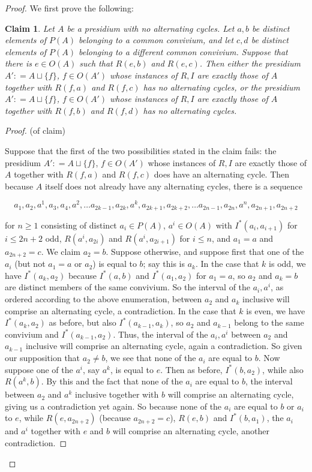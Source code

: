 \documentclass[10pt,a4paper]{amsart}
\newtheorem{claim}{Claim}
\begin{document}
\begin{proof}
    We first prove the following:


        \begin{claim}
       \label{order construction 1} Let $A$ be a presidium with no alternating cycles. Let $a, b$ be distinct elements of $P(A)$ belonging to a common convivium, and let $c, d$ be distinct elements of $P(A)$ belonging to a different common convivium. Suppose that there is $e \in O(A) $ such that $R(e, b)$ and $R(e, c)$. Then either the presidium $A' : = A \sqcup \{f\}$, $f \in O(A')$ whose instances of $R, I$ are exactly those of $A$ together with $R(f, a)$ and $R(f, c)$ has no alternating cycles, or the presidium $A' : = A \sqcup \{f\}$, $f \in O(A')$ whose instances of $R, I$ are exactly those of $A$ together with $R(f, b)$ and $R(f, d)$ has no alternating cycles.
    \end{claim}
\begin{proof}
    (of claim)
    
    Suppose that the first of the two possibilities stated in the claim fails: the presidium $A' : = A \sqcup \{f\}$, $f \in O(A')$ whose instances of $R, I$ are exactly those of $A$ together with $R(f, a)$ and $R(f, c)$ does have an alternating cycle. Then because $A$ itself does not already have any alternating cycles, there is a sequence 
   
   $$a_1, a_2, a^{1}, a_{3}, a_{4}, a^{2}, \ldots a_{2k-1}, a_{2k}, a^{k}, a_{2k+1}, a_{2k+2}, \ldots a_{2n-1}, a_{2n}, a^{n}, a_{2n+1}, a_{2n+2} $$

for $n \geq 1$ consisting of distinct $a_i \in P(A)$, $a^i \in O(A)$ with $I^{*}(a_i, a_{i+1})$ for $i \leq 2n+2$ odd, $R(a^i, a_{2i})$ and $R(a^i, a_{2i+1})$ for $i \leq n$,  and $a_1 = a$ and $a_{2n+2} = c$.  We claim $a_2 = b$. Suppose otherwise, and suppose first that one of the $a_i$ (but not $a_1= a$ or $a_2$) is equal to $b$; say this is $a_k$.  In the case that $k$ is odd, we have $I^{*}(a_k, a_2)$ because $I^{*}(a, b) $ and $I^{*}(a_{1}, a_{2})$ for $a_{1} = a$, so $a_{2}$ and $a_{k} = b$ are distinct members of the same convivium. So the interval of the $a_i, a^{i}$, as ordered according to the above enumeration, between $a_{2}$ and $a_{k}$ inclusive will comprise an alternating cycle, a contradiction.  In the case that $k$ is even, we have $I^{*}(a_k, a_2)$ as before, but also $I^{*}(a_{k-1}, a_k)$, so $a_{2}$ and $a_{k-1}$ belong to the same convivium and $I^{*}(a_{k-1}, a_{2})$. Thus, the interval of the $a_i, a^{i}$ between $a_{2}$ and $a_{k-1}$ inclusive will comprise an alternating cycle, again a contradiction.  So given our supposition that $a_2 \neq b$, we see that none of the $a_i$ are equal to $b$. Now suppose one of the $a^i$, say $a^{k}$, is equal to $e$.  Then as before, $I^{*}(b, a_{2})$, while also $R(a^{k}, b)$. By this and the fact that none of the $a_i$ are equal to $b$, the interval between $a_{2}$ and $a^{k}$ inclusive together with $b$ will comprise an alternating cycle, giving us a contradiction yet again. So because none of the $a_i$ are equal to $b$ or $a_i$ to $e$, while $R(e, a_{2n+2})$ (because $a_{2n+2}=c$), $R(e, b)$ and $I^{*}(b, a_1)$, the $a_i$ and $a^i$ together with $e$ and $b$ will comprise an alternating cycle, another contradiction.


\end{proof}
\end{proof}
\end{document}

